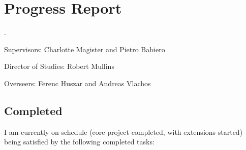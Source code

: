 \section{Progress Report}

.

Supervisors: Charlotte Magister and Pietro Babiero

Director of Studies: Robert Mullins

Overseers: Ferenc Huszar and Andreas Vlachos

\subsection{Completed}

I am currently on schedule (core project completed, with extensions started) being satisfied by the following completed tasks:
